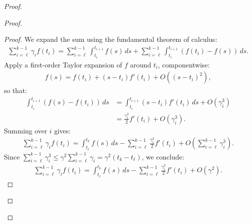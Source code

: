 \documentclass[11pt]{article}
\begin{document}
\begin{proof}
\begin{proof}
\begin{proof}
We expand the sum using the fundamental theorem of calculus:
\begin{align*}
\sum_{i=\ell}^{k-1} \gamma_i f(t_i) = \sum_{i=\ell}^{k-1} \int_{t_i}^{t_{i+1}} f(s) \, ds + \sum_{i=\ell}^{k-1} \int_{t_i}^{t_{i+1}} \left( f(t_i) - f(s) \right) \, ds.
\end{align*}
Apply a first-order Taylor expansion of \( f \) around \( t_i \), componentwise:
\begin{align*}
f(s) = f(t_i) + (s - t_i) f'(t_i) + O((s - t_i)^2),
\end{align*}
so that:
\begin{align*}
\int_{t_i}^{t_{i+1}} \left( f(s) - f(t_i) \right) \, ds 
&= \int_{t_i}^{t_{i+1}} (s - t_i) f'(t_i) \, ds + O(\gamma_i^3) \\
&= \frac{\gamma_i^2}{2} f'(t_i) + O(\gamma_i^3) .
\end{align*}
Summing over \( i \) gives:
\begin{align*}
\sum_{i=\ell}^{k-1} \gamma_i f(t_i) 
= \int_{t_\ell}^{t_k} f(s) \, ds - \sum_{i=\ell}^{k-1} \frac{\gamma_i^2}{2} f'(t_i) + O\left( \sum_{i=\ell}^{k-1} \gamma_i^3 \right).
\end{align*}
Since \( \sum_{i=\ell}^{k-1} \gamma_i^3 \leq \gamma^2 \sum_{i=\ell}^{k-1} \gamma_i = \gamma^2 (t_k - t_\ell) \), we conclude:
\begin{align*}
\sum_{i=\ell}^{k-1} \gamma_i f(t_i) 
= \int_{t_\ell}^{t_k} f(s) \, ds - \sum_{i=\ell}^{k-1} \frac{\gamma_i^2}{2} f'(t_i) + O\left( \gamma^2 \right).
\end{align*}


\end{proof}
\end{proof}
\end{proof}
\end{document}
